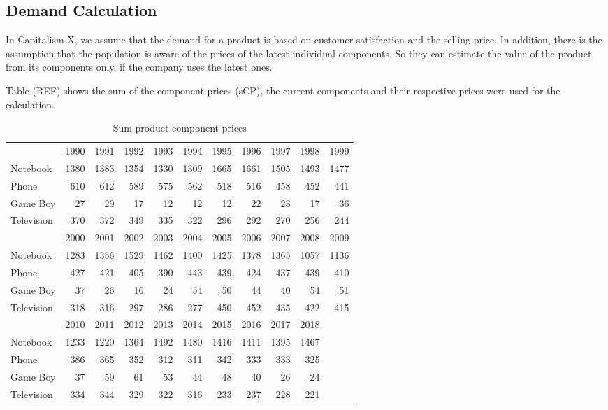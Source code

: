 \subsection{Demand Calculation}
\label{demandCalc}
In Capitalism X, we assume that the demand for a product is based on customer satisfaction and the selling price. In addition, there is the assumption that the population is aware of the prices of the latest individual components. So they can estimate the value of the product from its components only, if the company uses the latest ones.
 
Table (REF) shows the sum of the component prices (sCP), the current components and their respective prices were used for the calculation.

\begin{table}[ht]
    \centering
    \begin{tabular}{|l|r|r|r|r|r|r|r|r|r|r|}
    \hline
                & 1990  & 1991  & 1992  & 1993  & 1994  & 1995  & 1996  & 1997  & 1998  & 1999  \\
    Notebook    & 1380  & 1383  & 1354  & 1330  & 1309  & 1665  & 1661  & 1505  & 1493  & 1477  \\   
    Phone       & 610   & 612   & 589   & 575   & 562   & 518   & 516   & 458   & 452   & 441   \\ 
    Game Boy    & 27    & 29    & 17    & 12    & 12    & 12    & 22    & 23    & 17    & 36    \\  
    Television  & 370   & 372   & 349   & 335   & 322   & 296   & 292   & 270   & 256   & 244    \\ 
    \hline       
                & 2000  & 2001  & 2002  & 2003  & 2004  & 2005  & 2006  & 2007  & 2008  & 2009 \\
    Notebook    & 1283  & 1356  & 1529  & 1462  & 1400  & 1425  & 1378  & 1365  & 1057  & 1136 \\   
    Phone       & 427   & 421   & 405   & 390   & 443   & 439   & 424   & 437   & 439   & 410 \\  
    Game Boy    & 37    & 26    & 16    & 24    & 54    & 50    & 44    & 40    & 54    & 51  \\   
    Television  & 318   & 316   & 297   & 286   & 277   & 450   & 452   & 435   & 422   & 415 \\ 
    \hline
                & 2010  & 2011  & 2012  & 2013  & 2014  & 2015  & 2016  & 2017  & 2018   & \\
    Notebook    & 1233  & 1220  & 1364  & 1492  & 1480  & 1416  & 1411  & 1395  & 1467   & \\   
    Phone       & 386   & 365   & 352   & 312   & 311   & 342   & 333   & 333   & 325    & \\ 
    Game Boy    & 37    & 59    & 61    & 53    & 44    & 48    & 40    & 26    & 24     & \\  
    Television  & 334   & 344   & 329   & 322   & 316   & 233   & 237   & 228   & 221    & \\ 
    \hline
    \end{tabular}
    \caption{Sum product component prices}
    \label{sum_product_component_prices}
\end{table}
 
